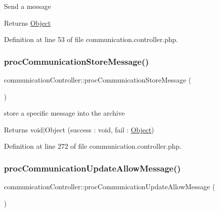 Send a message \begin{DoxyReturn}{Returns}
\hyperlink{classObject}{Object} 
\end{DoxyReturn}


Definition at line 53 of file communication.\+controller.\+php.

\mbox{\label{classcommunicationController_a50a2908615212e7774c1eff13df4897e}} 
\subsubsection{\texorpdfstring{proc\+Communication\+Store\+Message()}{procCommunicationStoreMessage()}}
{\footnotesize\ttfamily communication\+Controller\+::proc\+Communication\+Store\+Message (\begin{DoxyParamCaption}{ }\end{DoxyParamCaption})}

store a specific message into the archive \begin{DoxyReturn}{Returns}
void$\vert$\+Object (success \+: void, fail \+: \hyperlink{classObject}{Object}) 
\end{DoxyReturn}


Definition at line 272 of file communication.\+controller.\+php.

\mbox{\label{classcommunicationController_a22b9183c8d27ba9035d7b3a38cda696a}} 
\subsubsection{\texorpdfstring{proc\+Communication\+Update\+Allow\+Message()}{procCommunicationUpdateAllowMessage()}}
{\footnotesize\ttfamily communication\+Controller\+::proc\+Communication\+Update\+Allow\+Message (\begin{DoxyParamCaption}{ }\end{DoxyParamCaption})}

